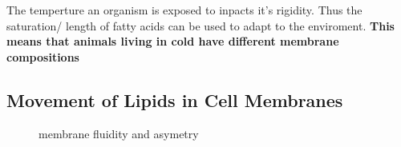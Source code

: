 \documentclass[../main.tex]{subfiles}
\begin{document}
        The temperture an organism is exposed to inpacts it's rigidity. Thus the saturation/ length of fatty acids can be used to adapt to the enviroment. \textbf{This means that animals living in cold have different membrane compositions}


    \subsection{Movement of Lipids in Cell Membranes}
        \begin{figure}[H]
            \centering
            \hspace{0.05\textwidth} %
           


             \caption{membrane fluidity and asymetry}
        \end{figure}
    
\end{document}
